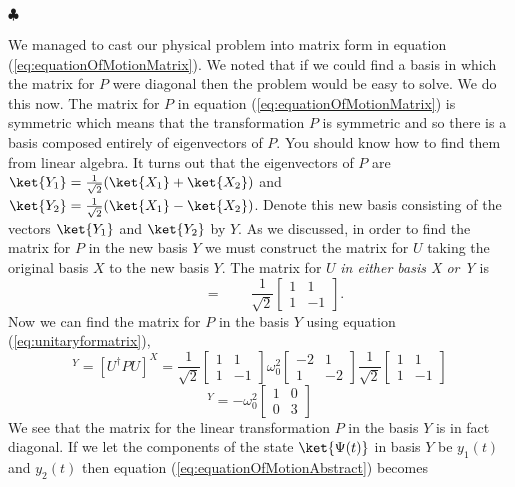 \begin{flushleft}$\clubsuit$\end{flushleft}%
We managed to cast our physical problem into matrix form in equation (\ref{eq:equationOfMotionMatrix}).  We noted that if we could find a basis in which the matrix for $P$ were diagonal then the problem would be easy to solve.  We do this now.  The matrix for $P$ in equation (\ref{eq:equationOfMotionMatrix}) is symmetric which means that the transformation $P$ is symmetric and so there is a basis composed entirely of eigenvectors of $P$.  You should know how to find them from linear algebra.  It turns out that the eigenvectors of $P$ are \mbox{$\ket{Y_1} = \frac{1}{\sqrt{2}}(\ket{X_1}+\ket{X_2})$} and \mbox{$\ket{Y_2} = \frac{1}{\sqrt{2}}(\ket{X_1}-\ket{X_2})$}.  Denote this new basis consisting of the vectors $\ket{Y_1}$ and $\ket{Y_2}$ by $Y$.  As we discussed, in order to find the matrix for $P$ in the new basis $Y$ we must construct the matrix for $U$ taking the original basis $X$ to the new basis $Y$.  The matrix for $U$ \emph{in either basis X or Y} is
\begin{displaymath} [U] \qquad = \qquad \frac{1}{\sqrt{2}}\left[ \begin{array}{cc} 1&1 \\ 1&-1 \end{array} \right]. \end{displaymath}
Now we can find the matrix for $P$ in the basis $Y$ using equation (\ref{eq:unitaryformatrix}),
\begin{displaymath} [P]^{Y} = [U^{\dag}PU]^{X} = 
\frac{1}{\sqrt{2}} \left[ \begin{array}{cc} 1&1 \\ 1&-1 \end{array} \right]
\omega _{0}^{2} \left[ \begin{array}{cc} -2&1 \\ 1&-2 \end{array} \right]
\frac{1}{\sqrt{2}} \left[ \begin{array}{cc} 1&1 \\ 1&-1 \end{array} \right]
\end{displaymath}
\begin{displaymath} [P]^Y = -\omega _{0}^{2} \left[ \begin{array}{cc} 1&0 \\ 0&3 \end{array} \right] \end{displaymath}
We see that the matrix for the linear transformation $P$ in the basis $Y$ is in fact diagonal.  If we let the components of the state $\ket{\Psi (t)}$ in basis $Y$ be $y_1(t)$ and $y_2(t)$ then equation (\ref{eq:equationOfMotionAbstract}) becomes
